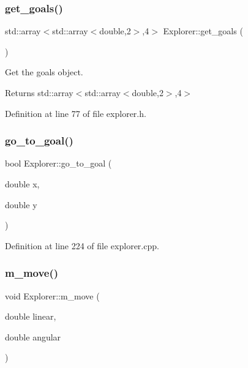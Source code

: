 \mbox{\label{class_explorer_a847e3ad2e7233d493a8dcfdd7139cb58}} 
\subsubsection{\texorpdfstring{get\+\_\+goals()}{get\_goals()}}
{\footnotesize\ttfamily std\+::array$<$std\+::array$<$double,2$>$,4$>$ Explorer\+::get\+\_\+goals (\begin{DoxyParamCaption}{ }\end{DoxyParamCaption})\hspace{0.3cm}{\ttfamily [inline]}}



Get the goals object. 

\begin{DoxyReturn}{Returns}
std\+::array$<$std\+::array$<$double,2$>$,4$>$ 
\end{DoxyReturn}


Definition at line 77 of file explorer.\+h.

\mbox{\label{class_explorer_aa1e259feaac1114adb0f24588428e8ef}} 
\subsubsection{\texorpdfstring{go\+\_\+to\+\_\+goal()}{go\_to\_goal()}}
{\footnotesize\ttfamily bool Explorer\+::go\+\_\+to\+\_\+goal (\begin{DoxyParamCaption}\item[{double}]{x,  }\item[{double}]{y }\end{DoxyParamCaption})}



Definition at line 224 of file explorer.\+cpp.

\mbox{\label{class_explorer_ace304ef65547f4a3ff6458d934c54e87}} 
\subsubsection{\texorpdfstring{m\+\_\+move()}{m\_move()}}
{\footnotesize\ttfamily void Explorer\+::m\+\_\+move (\begin{DoxyParamCaption}\item[{double}]{linear,  }\item[{double}]{angular }\end{DoxyParamCaption})}



